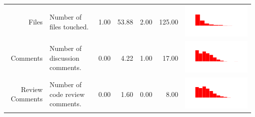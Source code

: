 \documentclass[conference]{IEEEtran}
\begin{document}
\begin{table}[ht]
\begin{tabular}{rp{26em}rrrrc}
    Files & Number of files touched. & 1.00 & 53.88 & 2.00 & 125.00 & \includegraphics[scale = 0.09, clip = true, trim= 50px 60px 50px 60px]{../figs/hist-features/hist-files.pdf} \\
    Comments & Number of discussion comments. & 0.00 & 4.22 & 1.00 & 17.00 & \includegraphics[scale = 0.09, clip = true, trim= 50px 60px 50px 60px]{../figs/hist-features/hist-comments.pdf} \\
    Review Comments & Number of code review comments. & 0.00 & 1.60 & 0.00 & 8.00 & \includegraphics[scale = 0.09, clip = true, trim= 50px 60px 50px 60px]{../figs/hist-features/hist-reviewComments.pdf} \\

\end{tabular}
\end{table}
\end{document}
